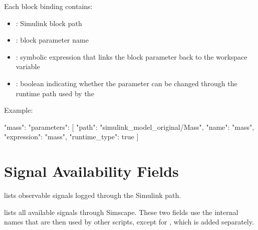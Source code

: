 \documentclass[11pt]{article}
\begin{document}
Each block binding contains:

\begin{itemize}
\item {}: Simulink block path
\item {}: block parameter name
\item {}: symbolic expression that links the block parameter back to the workspace variable
\item {}: boolean indicating whether the parameter can be changed through the runtime path used by the \termSimulator
\end{itemize}

Example:

\begin{DocCode}
"mass": {
  "parameters": [
    {
      "path": "simulink_model_original/Mass\nCenter",
      "name": "mass",
      "expression": "mass",
      "runtime_type": true
    }
  ]
}
\end{DocCode}

\section*{Signal Availability Fields}

 lists observable signals logged through the Simulink path.

 lists all available signals through Simscape.
These two fields use the internal names that are then used by other scripts, except for , which is added separately.
\end{document}
